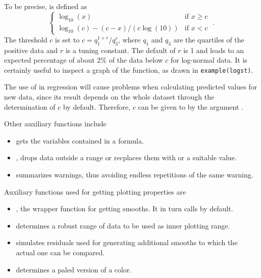 \documentclass[11pt]{article}
\begin{document}
To be precise,  is defined as
$$
         \left\{\begin{array}{ll}\log_{10}(x) & \mbox{if\ \ } x\ge c\\
         \log_{10}(c) - (c-x)/(c\log(10)) & \mbox{if\ \ } x< c
         \end{array}\right.
\;.$$
The threshold $c$ is set to
$ c = q_1^{1+r}/q_3^r$, where $q_1$ and $q_3$ are the quartiles of the 
positive data and $r$ is a tuning constant. 
The default of $r$ is 1 and leads to an expected
percentage of about 2\% of the data below $c$ for log-normal data.
It is certainly useful to inspect a graph of the function, as drawn in 
\texttt{example(logst)}.

The use of  in regression will cause problems when calculating
predicted values for new data, since its result depends on the whole
dataset through the determination of $c$ by default. 
Therefore, $c$ can be given to  by the argument .

Other auxiliary functions include
\begin{itemize}
\item
   gets the variables contained in a formula.
\item 
  , drops data outside a range or recplaces them with 
  or a suitable value.
\item
   summarizes warnings, thus avoiding endless repetitions of the
  same warning.
\end{itemize}

Auxiliary functions used for getting plotting properties are
\begin{itemize}
\item
  , the wrapper function for getting smooths.
  It in turn calls  by default.
\item 
   determines a robust range of data to be used as inner
  plotting range.
\item
   simulates residuals used for generating additional
  smooths to which the actual one can be compared.
\item
   determines a paled version of a color.
\end{itemize}
\end{document}
